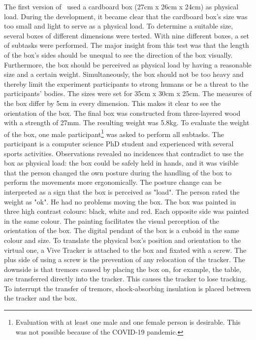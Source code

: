 The first version of \exgo\ used a cardboard box (27cm x 26cm x 24cm) as physical load. During the development, it became clear that the cardboard box's size was too small and light to serve as a physical load. To determine a suitable size, several boxes of different dimensions were tested. With nine different boxes, a set of subtasks were performed. The major insight from this test was that the length of the box's sides should be unequal to see the direction of the box visually. Furthermore, the box should be perceived as physical load by having a reasonable size and a certain weight. Simultaneously, the box should not be too heavy and thereby limit the experiment participants to strong humans or be a threat to the participants' bodies. The sizes were set for 35cm x 30cm x 25cm. The measures of the box differ by 5cm in every dimension. This makes it clear to see the orientation of the box. The final box was constructed from three-layered wood with a strength of 27mm. The resulting weight was 5.8kg. To evaluate the weight of the box, one male participant\footnote{Evaluation with at least one male and one female person is desirable. This was not possible because of the COVID-19 pandemic.} was asked to perform all subtasks. The participant is a computer science PhD student and experienced with several sports activities. Observations revealed no incidences that contradict to use the box as physical load: the box could be safely held in hands, and it was visible that the person changed the own posture during the handling of the box to perform the movements more ergonomically. The posture change can be interpreted as a sign that the box is perceived as "load". The person rated the weight as "ok". He had no problems moving the box. The box was painted in three high contrast colours: black, white and red. Each opposite side was painted in the same colour. The painting facilitates the visual perception of the orientation of the box. The digital pendant of the box is a cuboid in the same colour and size. To translate the physical box's position and orientation to the virtual one, a Vive Tracker is attached to the box and fixated with a screw. The plus side of using a screw is the prevention of any relocation of the tracker. The downside is that tremors caused by placing the box on, for example, the table, are transferred directly into the tracker. This causes the tracker to lose tracking. To interrupt the transfer of tremors, shock-absorbing insulation is placed between the tracker and the box.\\
